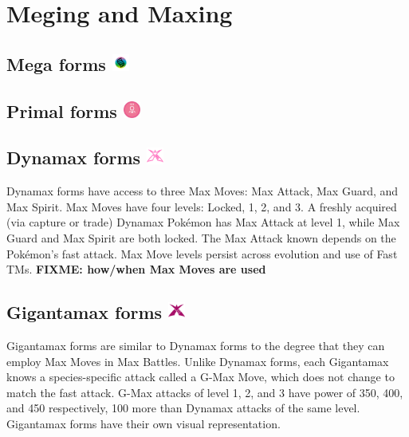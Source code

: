 \chapter{Meging and Maxing}
\label{chap:megmax}

\section{Mega forms \includegraphics[width=1em,height=1em]{images/mega.png}}
\label{section:mega}


\section{Primal forms \includegraphics[width=1em,height=1em]{images/primal.png}}
\label{section:primal}

\section{Dynamax forms \includegraphics[width=1em,height=1em]{images/dynamax.png}}
\label{section:dmax}
Dynamax forms have access to three Max Moves: Max Attack, Max Guard, and Max Spirit.
Max Moves have four levels: Locked, 1, 2, and 3.
A freshly acquired (via capture or trade) Dynamax Pokémon has Max Attack at level 1,
  while Max Guard and Max Spirit are both locked.
The Max Attack known depends on the Pokémon's fast attack.
Max Move levels persist across evolution and use of Fast TMs.
\textbf{FIXME: how/when Max Moves are used}


\section{Gigantamax forms \includegraphics[width=1em,height=1em]{images/gigantamax.png}}
\label{section:gmax}
Gigantamax forms are similar to Dynamax forms to the degree that they can
  employ Max Moves in Max Battles.
Unlike Dynamax forms, each Gigantamax knows a species-specific attack
  called a G-Max Move, which does not change to match the fast attack.
G-Max attacks of level 1, 2, and 3 have power of 350, 400, and 450
  respectively, 100 more than Dynamax attacks of the same level.
Gigantamax forms have their own visual representation.

